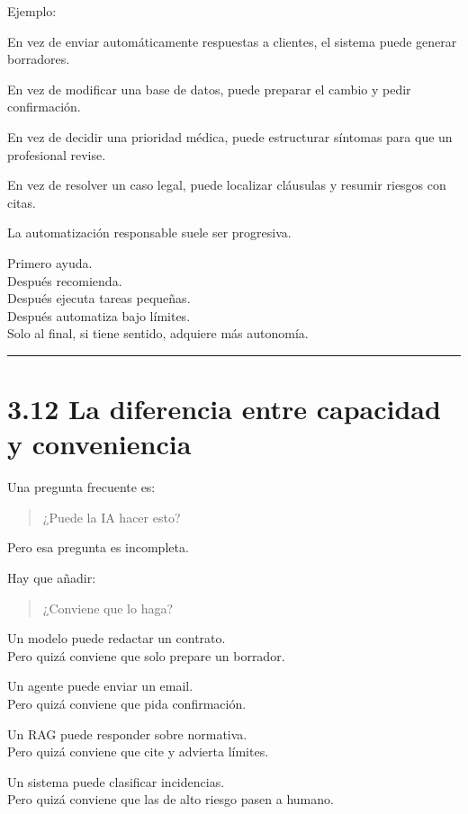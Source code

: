 Ejemplo:

En vez de enviar automáticamente respuestas a clientes, el sistema puede
generar borradores.

En vez de modificar una base de datos, puede preparar el cambio y pedir
confirmación.

En vez de decidir una prioridad médica, puede estructurar síntomas para
que un profesional revise.

En vez de resolver un caso legal, puede localizar cláusulas y resumir
riesgos con citas.

La automatización responsable suele ser progresiva.

Primero ayuda.\\
Después recomienda.\\
Después ejecuta tareas pequeñas.\\
Después automatiza bajo límites.\\
Solo al final, si tiene sentido, adquiere más autonomía.

\begin{center}\rule{0.5\linewidth}{0.5pt}\end{center}

\section{3.12 La diferencia entre capacidad y
conveniencia}\label{la-diferencia-entre-capacidad-y-conveniencia}

Una pregunta frecuente es:

\begin{quote}
¿Puede la IA hacer esto?
\end{quote}

Pero esa pregunta es incompleta.

Hay que añadir:

\begin{quote}
¿Conviene que lo haga?
\end{quote}

Un modelo puede redactar un contrato.\\
Pero quizá conviene que solo prepare un borrador.

Un agente puede enviar un email.\\
Pero quizá conviene que pida confirmación.

Un RAG puede responder sobre normativa.\\
Pero quizá conviene que cite y advierta límites.

Un sistema puede clasificar incidencias.\\
Pero quizá conviene que las de alto riesgo pasen a humano.

